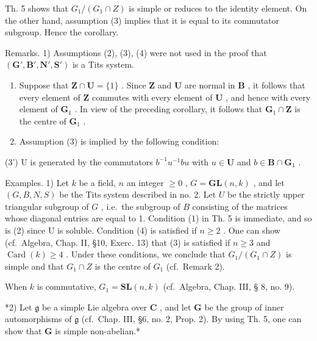 Th. 5 shows that \(G_{1}/(G_{1} \cap Z)\) is simple or reduces to the identity element. On the other hand, assumption (3) implies that it is equal to its commutator subgroup. Hence the corollary.

Remarks. 1) Assumptions (2), (3), (4) were not used in the proof that \((\mathbf{G}', \mathbf{B}', \mathbf{N}', \mathbf{S}')\) is a Tits system.

\begin{enumerate}
\def\labelenumi{\arabic{enumi})}
\setcounter{enumi}{1}
\item
  Suppose that \(\mathbf{Z} \cap \mathbf{U} = \{1\}\) . Since \(\mathbf{Z}\) and \(\mathbf{U}\) are normal in \(\mathbf{B}\) , it follows that every element of \(\mathbf{Z}\) commutes with every element of \(\mathbf{U}\) , and hence with every element of \(\mathbf{G}_1\) . In view of the preceding corollary, it follows that \(\mathbf{G}_1 \cap \mathbf{Z}\) is the centre of \(\mathbf{G}_1\) .
\item
  Assumption (3) is implied by the following condition:
\end{enumerate}

(3') U is generated by the commutators \(b^{-1}u^{-1}bu\) with \(u \in \mathbf{U}\) and \(b \in \mathbf{B} \cap \mathbf{G}_1\) .

Examples. 1) Let \(k\) be a field, \(n\) an integer \(\geqslant 0\) , \(G = \mathbf{GL}(n, k)\) , and let \((G, B, N, S)\) be the Tits system described in no. 2. Let \(U\) be the strictly upper triangular subgroup of \(G\) , i.e.~the subgroup of \(B\) consisting of the matrices whose diagonal entries are equal to 1. Condition (1) in Th. 5 is immediate, and so is (2) since U is soluble. Condition (4) is satisfied if \(n \geqslant 2\) . One can show (cf.~Algebra, Chap. II, §10, Exerc. 13) that (3) is satisfied if \(n \geqslant 3\) and \(\operatorname{Card}(k) \geqslant 4\) . Under these conditions, we conclude that \(G_{1}/(G_{1} \cap Z)\) is simple and that \(G_{1} \cap Z\) is the centre of \(G_{1}\) (cf.~Remark 2).

When \(k\) is commutative, \(G_1 = \mathbf{SL}(n,k)\) (cf.~Algebra, Chap. III, § 8, no. 9).

*2) Let \(\mathfrak{g}\) be a simple Lie algebra over \(\mathbf{C}\) , and let \(\mathbf{G}\) be the group of inner automorphisms of \(\mathfrak{g}\) (cf.~Chap. III, §6, no. 2, Prop. 2). By using Th. 5, one can show that \(\mathbf{G}\) is simple non-abelian.*

